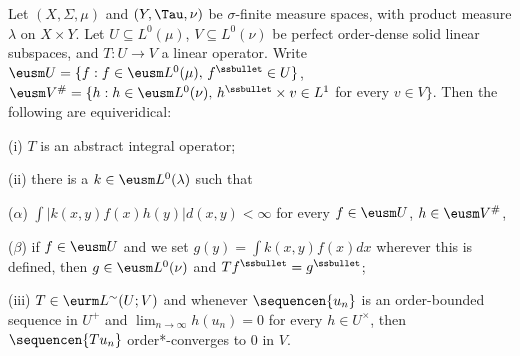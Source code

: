 
 Let $(X,\Sigma,\mu)$ and $(Y,\Tau,\nu)$ be
$\sigma$-finite measure spaces, with product measure $\lambda$ on
$X\times Y$.   Let $U\subseteq L^0(\mu)$,
$V\subseteq L^0(\nu)$ be perfect order-dense solid linear subspaces, and
$T:U\to V$ a linear operator.   Write
$\eusm U=\{f:f\in\eusm L^0(\mu),\,f^{\ssbullet}\in U\}$,
$\eusm V^{\#}=\{h:h\in\eusm L^0(\nu),\,h^{\ssbullet}\times v\in L^1$ for
every $v\in V\}$.   Then the following are equiveridical:

(i) $T$ is an abstract integral operator;

(ii) there is a $k\in\eusm L^0(\lambda)$ such that

\quad ($\alpha$) $\int|k(x,y)f(x)h(y)|d(x,y)<\infty$ for every
$f\in\eusm U$, $h\in\eusm V^{\#}$,

\quad ($\beta$) if $f\in\eusm U$ and we set $g(y)=\int k(x,y)f(x)dx$
wherever this is defined, then $g\in\eusm L^0(\nu)$ and
$Tf^{\ssbullet}=g^{\ssbullet}$;

(iii) $T\in\eurm L^{\sim}(U;V)$ and whenever $\sequencen{u_n}$ is an
order-bounded sequence in $U^+$ and $\lim_{n\to\infty}h(u_n)=0$ for
every $h\in U^{\times}$, then $\sequencen{Tu_n}$ order*-converges to
$0$ in $V$.


